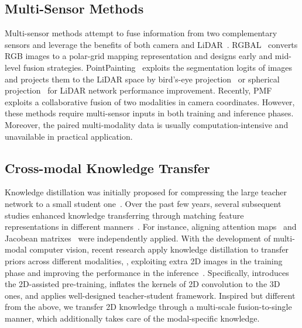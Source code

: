 \documentclass[runningheads]{llncs}
\begin{document}
	\subsection{Multi-Sensor Methods}
	Multi-sensor methods attempt to fuse information from two complementary sensors and leverage the benefits of both camera and LiDAR~\cite{krispel2020fuseseg,el2019rgb,meyer2019sensor,vora2020pointpainting}.
RGBAL~\cite{el2019rgb} converts RGB images to a polar-grid mapping representation and designs early and mid-level fusion strategies. 
PointPainting~\cite{vora2020pointpainting} exploits the segmentation logits of images and projects them to the LiDAR space by bird's-eye projection~\cite{yuan2018ocnet} or spherical projection~\cite{milioto2019rangenet++} for LiDAR network performance improvement. 
Recently, PMF~\cite{zhuang2021perception} exploits a collaborative fusion of two modalities in camera coordinates.
However, these methods require multi-sensor inputs in both training and inference phases. 
Moreover, the paired multi-modality data is usually computation-intensive and unavailable in practical application.
	
	\subsection{Cross-modal Knowledge Transfer}
	
	Knowledge distillation was initially proposed for compressing the large teacher network to a small student one~\cite{hinton2015distilling}.
Over the past few years, several subsequent studies enhanced knowledge transferring through matching feature representations in different manners~\cite{ba2013deep,chen2017learning,zagoruyko2016paying,srinivas2018knowledge}.
For instance, aligning attention maps~\cite{zagoruyko2016paying} and Jacobean matrixes~\cite{srinivas2018knowledge} were independently applied.
With the development of multi-modal computer vision, recent research apply knowledge distillation to transfer priors across different modalities, \eg, exploiting extra 2D images in the training phase and improving the performance in the inference~\cite{gupta2016cross,wang2019efficient,yuan2018rgb,liu20213d,zhao2020knowledge}.
Specifically, \cite{liu2021learning} introduces the 2D-assisted pre-training, \cite{xu2021image2point} inflates the kernels of 2D convolution to the 3D ones, and \cite{yuan2022x} applies well-designed teacher-student framework.
Inspired but different from the above, we transfer 2D knowledge through a multi-scale fusion-to-single manner, which additionally takes care of the modal-specific knowledge.
		
\end{document}
